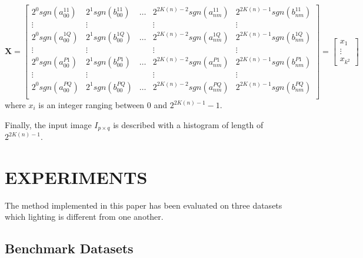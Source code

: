 \documentclass[]{spie}  %
\begin{document}
\begin{equation}
\mathbf{X} = 
  \begin{bmatrix}
2^0sgn(a_{00}^{11}) & 2^1sgn(b_{00}^{11}) & \hdots & 2^{2 K(n)-2}sgn(a_{nm}^{11}) & 2^{2 K(n)-1}sgn(b_{nm}^{11}) \\
  \vdots  & \vdots & & \vdots  & \vdots\\
2^0sgn(a_{00}^{1Q}) & 2^1sgn(b_{00}^{1Q}) & \hdots & 2^{2 K(n)-2}sgn(a_{nm}^{1Q}) & 2^{2 K(n)-1}sgn(b_{nm}^{1Q}) \\
  \vdots  & \vdots & & \vdots  & \vdots\\
2^0sgn(a_{00}^{P1}) & 2^1sgn(b_{00}^{P1}) & \hdots & 2^{2 K(n)-2}sgn(a_{nm}^{P1}) & 2^{2 K(n)-1}sgn(b_{nm}^{P1}) \\
  \vdots  & \vdots & & \vdots  & \vdots\\
2^0sgn(a_{00}^{PQ}) &2^1sgn(b_{00}^{PQ}) & \hdots & 2^{2 K(n)-2}sgn(a_{nm}^{PQ}) & 2^{2 K(n)-1}sgn(b_{nm}^{PQ}) \\
 \end{bmatrix}=
 \begin{bmatrix}
 x_{1} \\
 \vdots \\
 x_{k^2}
 \end{bmatrix}
 \label{eq:lzm_coded}
\end{equation}
where $x_{i}$ is an integer ranging between $0$ and $2^{2K(n)-1}-1$. 

Finally, the input image $I_{p\times q}$ is described with a histogram of length of $2^{2K(n)-1}$.



\section{EXPERIMENTS}

The method implemented in this paper has been evaluated on three datasets which lighting is different from one another. 

\subsection{Benchmark Datasets}
\end{document}
